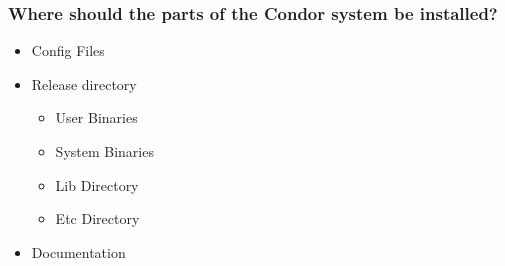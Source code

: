 \subsubsection{ Where should the parts of the Condor system be installed? }
	\begin{itemize}
	\item Config Files
	\item Release directory
		\begin{itemize}
		\item User Binaries
		\item System Binaries 
		\item Lib Directory
	  	\item Etc Directory
		\end{itemize}
	\item Documentation
	\end{itemize}

